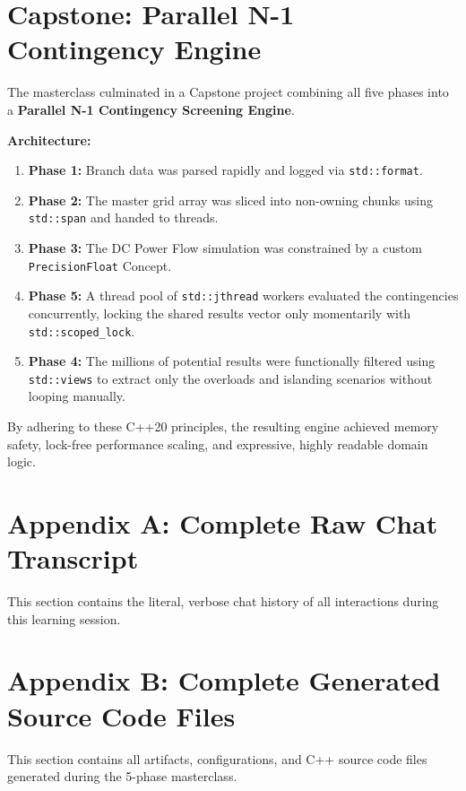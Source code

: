 \documentclass[11pt,a4paper]{article}
\begin{document}
\section{Capstone: Parallel N-1 Contingency Engine}
The masterclass culminated in a Capstone project combining all five phases into a \textbf{Parallel N-1 Contingency Screening Engine}.

\textbf{Architecture:}
\begin{enumerate}
    \item \textbf{Phase 1:} Branch data was parsed rapidly and logged via \texttt{std::format}.
    \item \textbf{Phase 2:} The master grid array was sliced into non-owning chunks using \texttt{std::span} and handed to threads.
    \item \textbf{Phase 3:} The DC Power Flow simulation was constrained by a custom \texttt{PrecisionFloat} Concept.
    \item \textbf{Phase 5:} A thread pool of \texttt{std::jthread} workers evaluated the contingencies concurrently, locking the shared results vector only momentarily with \texttt{std::scoped\_lock}.
    \item \textbf{Phase 4:} The millions of potential results were functionally filtered using \texttt{std::views} to extract only the overloads and islanding scenarios without looping manually.
\end{enumerate}

By adhering to these C++20 principles, the resulting engine achieved memory safety, lock-free performance scaling, and expressive, highly readable domain logic.

\newpage
\appendix
\section{Appendix A: Complete Raw Chat Transcript}
This section contains the literal, verbose chat history of all interactions during this learning session.



\newpage
\section{Appendix B: Complete Generated Source Code Files}
This section contains all artifacts, configurations, and C++ source code files generated during the 5-phase masterclass.
\end{document}
